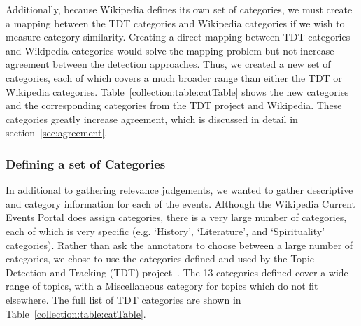 Additionally, because Wikipedia defines its own set of categories, we must create a mapping between the TDT categories and Wikipedia categories if we wish to measure category similarity.
Creating a direct mapping between TDT categories and Wikipedia categories would solve the mapping problem but not increase agreement between the detection approaches.
Thus, we created a new set of categories, each of which covers a much broader range than either the TDT or Wikipedia categories.
Table~\ref{collection:table:catTable} shows the new categories and the corresponding categories from the TDT project and Wikipedia.
These categories greatly increase agreement, which is discussed in detail in section~\ref{sec:agreement}.

\subsubsection{Defining a set of Categories}
In additional to gathering relevance judgements, we wanted to gather descriptive and category information for each of the events.
Although the Wikipedia Current Events Portal does assign categories, there is a very large number of categories, each of which is very specific (e.g. `History', `Literature', and `Spirituality' categories).
Rather than ask the annotators to choose between a large number of categories, we chose to use the categories defined and used by the Topic Detection and Tracking (TDT) project~\cite{Allan:2002:ITD:772260.772262}.
The 13 categories defined cover a wide range of topics, with a Miscellaneous category for topics which do not fit elsewhere.
The full list of TDT categories are shown in Table~\ref{collection:table:catTable}.

